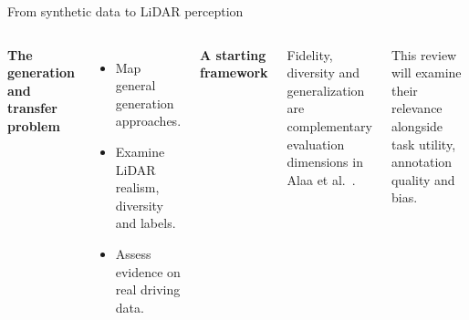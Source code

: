 \begin{frame}{From synthetic data to LiDAR perception}
\begin{columns}[T,onlytextwidth]
\textbf{The generation and transfer problem}
\begin{itemize}
\item Map general generation approaches.
\item Examine LiDAR realism, diversity and labels.
\item Assess evidence on real driving data.
\end{itemize}
\textbf{A starting framework}\par
\vspace{2mm}
Fidelity, diversity and generalization are complementary evaluation
dimensions in Alaa et al.~\parencite{alaaHowFaithfulYour2022}.
\vspace{4mm}

This review will examine their relevance alongside task utility,
annotation quality and bias.
\end{columns}
\end{frame}
